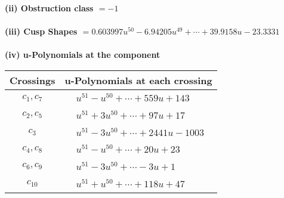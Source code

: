 \documentclass[1p]{elsarticle_modified}
\theoremstyle{definition}
\begin{document}
\flushleft \textbf{(ii) Obstruction class $= -1$}\\~\\
\flushleft \textbf{(iii) Cusp Shapes $= 0.603997 u^{50}-6.94205 u^{49}+\cdots+39.9158 u-23.3331$}\\~\\
\newpage\renewcommand{\arraystretch}{1}
\flushleft \textbf{(iv) u-Polynomials at the component}\newline \\
\begin{tabular}{m{50pt}|m{274pt}}
Crossings & \hspace{64pt}u-Polynomials at each crossing \\
\hline $$\begin{aligned}c_{1},c_{7}\end{aligned}$$&$\begin{aligned}
&u^{51}- u^{50}+\cdots+559 u+143
\end{aligned}$\\
\hline $$\begin{aligned}c_{2},c_{5}\end{aligned}$$&$\begin{aligned}
&u^{51}+3 u^{50}+\cdots+97 u+17
\end{aligned}$\\
\hline $$\begin{aligned}c_{3}\end{aligned}$$&$\begin{aligned}
&u^{51}-3 u^{50}+\cdots+2441 u-1003
\end{aligned}$\\
\hline $$\begin{aligned}c_{4},c_{8}\end{aligned}$$&$\begin{aligned}
&u^{51}- u^{50}+\cdots+20 u+23
\end{aligned}$\\
\hline $$\begin{aligned}c_{6},c_{9}\end{aligned}$$&$\begin{aligned}
&u^{51}-3 u^{50}+\cdots-3 u+1
\end{aligned}$\\
\hline $$\begin{aligned}c_{10}\end{aligned}$$&$\begin{aligned}
&u^{51}+u^{50}+\cdots+118 u+47
\end{aligned}$\\
\hline
\end{tabular}\\~\\
\end{document}

